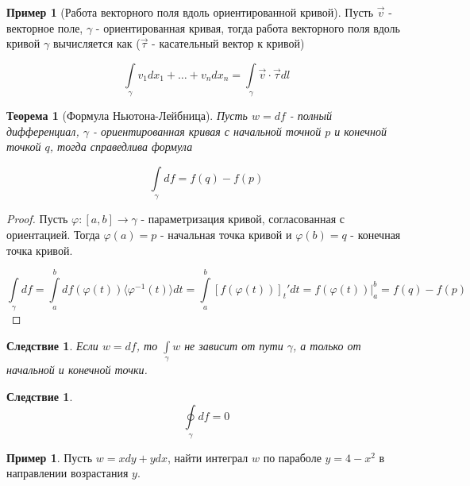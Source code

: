 \documentclass[a5paper]{article}
\newcounter{through}
\theoremstyle{plain}
\newtheorem{theorem}[through]{Теорема}
\newtheorem{corollary}[through]{Следствие}
\theoremstyle{definition}
\newtheorem{example}[through]{Пример}
\numberwithin{through}{section}
\numberwithin{equation}{section}
\begin{document}
\begin{example}[Работа векторного поля вдоль ориентированной кривой]
	Пусть $\vec{v}$ - векторное поле, $\gamma$ - ориентированная кривая, тогда работа векторного поля вдоль кривой $\gamma$ вычисляется как ($\vec{\tau}$ - касательный вектор к кривой)
	
	\begin{equation*}
		\int\limits_{\gamma} v_1 dx_1 + \ldots + v_n dx_n = \int\limits_{\gamma} \vec{v} \cdot \vec{\tau} dl
	\end{equation*}
\end{example}

\begin{theorem}[Формула Ньютона-Лейбница]
	Пусть $w=df$ - полный дифференциал, $\gamma$ - ориентированная кривая с начальной точной $p$ и конечной точкой $q$, тогда справедлива формула
	
	\begin{equation*}
		\int\limits_{\gamma} df = f(q) - f(p)
	\end{equation*}
\end{theorem}

\begin{proof}
	Пусть $\varphi : [a, b] \to \gamma$ - параметризация кривой, согласованная с ориентацией. Тогда $\varphi(a) = p$ - начальная точка кривой и $\varphi(b) = q$ - конечная точка кривой.
	
	\begin{equation*}
		\int\limits_{\gamma} df = \int\limits_{a}^{b} df(\varphi(t)) \langle \varphi^{-1}(t) \rangle dt = \int\limits_{a}^{b} [f(\varphi(t))]_t'dt = f(\varphi(t)) \bigg|_{a}^{b}=f(q) - f(p)
	\end{equation*}
\end{proof}

\begin{corollary}
	Если $w=df$, то $\int\limits_{\gamma} w$ не зависит от пути $\gamma$, а только от начальной и конечной точки.
\end{corollary}

\begin{corollary} \label{ClosedLoopInt}
	\begin{equation*}
		\oint\limits_{\gamma} df = 0
	\end{equation*}
\end{corollary}

\begin{example}
	Пусть $w = xdy + ydx$, найти интеграл $w$ по параболе $y = 4 - x^2$ в направлении возрастания $y$. 
\end{example}
\end{document}
